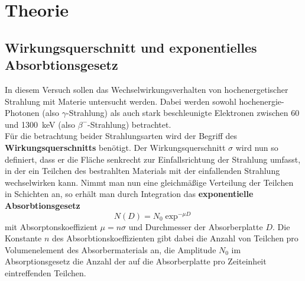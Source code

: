 \maketitle
\setcounter{page}{1}
\tableofcontents
\newpage
{}
\section{Theorie}
\subsection{Wirkungsquerschnitt und exponentielles Absorbtionsgesetz}

In diesem Versuch sollen das Wechselwirkungsverhalten von hochenergetischer Strahlung
mit Materie untersucht werden. Dabei werden sowohl hochenergie-Photonen (also $\gamma$-Strahlung)
als auch stark beschleunigte Elektronen zwischen \num{60} und \SI{1300}{\kilo\electronvolt}
(also $\beta^-$-Strahlung) betrachtet.\\
Für die betrachtung beider Strahlungsarten wird der Begriff des \textbf{Wirkungsquerschnitts}
benötigt. Der Wirkungsquerschnitt $\sigma$ wird nun so definiert, dass er die Fläche senkrecht
zur Einfallsrichtung der Strahlung umfasst, in der ein Teilchen des bestrahlten Materials
mit der einfallenden Strahlung wechselwirken kann. Nimmt man nun eine gleichmäßige
Verteilung der Teilchen in Schichten an, so erhält man durch Integration das \textbf{exponentielle
Absorbtionsgesetz}
\begin{equation}
  N(D) = N_0 \exp^{-\mu D}
  \label{eqn:1}
\end{equation}
mit Absorptonskoeffizient $\mu = n \sigma$ und Durchmesser der Absorberplatte $D$.
Die Konstante $n$ des Absorbtionskoeffizienten gibt dabei die Anzahl von Teilchen
pro Volumenelement des Absorbermaterials an, die Amplitude $N_0$ im Absorptionsgesetz die
Anzahl der auf die Absorberplatte pro Zeiteinheit eintreffenden Teilchen.

